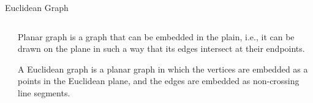 \documentclass[10pt]{beamer}
\begin{document}
\begin{frame}{Euclidean Graph}
\begin{columns}
	\begin{column}{0.4\textwidth} 
	\end{column}
	\begin{column}{0.6\textwidth}
		\alert{Planar graph} is a graph that can be embedded in the plain,
		i.e., it can be drawn on the plane in such a way that its edges
		intersect at their endpoints.
		\bigskip
		
		\alert{A Euclidean graph} is a planar graph in which the vertices are
		embedded as a points in the Euclidean plane, and the edges are embedded
		as non-crossing line segments. 
	\end{column}
\end{columns}
\end{frame}
\end{document}
